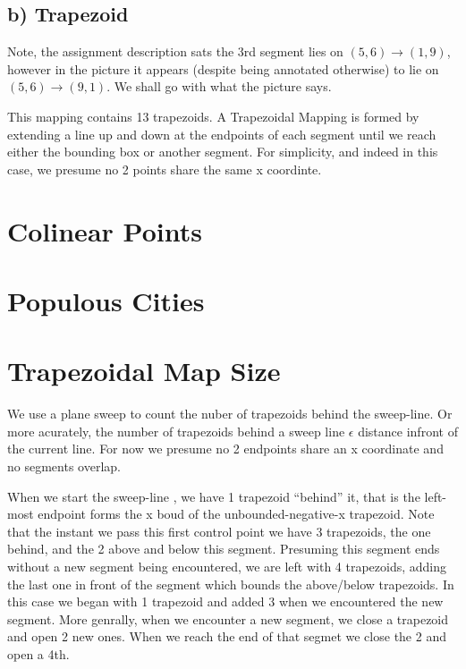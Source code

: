 \documentclass{article}
\begin{document}
\subsection{b) Trapezoid}
Note, the assignment description sats the 3rd segment lies on $(5,6) \rightarrow (1,9)$, however in the picture it appears (despite being annotated otherwise) to lie on $(5,6) \rightarrow (9,1)$.
We shall go with what the picture says.

This mapping contains 13 trapezoids.
A Trapezoidal Mapping is formed by extending a line up and down at the endpoints of each segment until we reach either the bounding box or another segment.
For simplicity, and indeed in this case, we presume no 2 points share the same x coordinte.

\section {Colinear Points}

\section {Populous Cities}

\section {Trapezoidal Map Size}

We use a plane sweep to count the nuber of trapezoids behind the sweep-line.
Or more acurately, the number of trapezoids behind a sweep line $\epsilon$ distance infront of the current line.
For now we presume no 2 endpoints share an x coordinate and no segments overlap.

When we start the sweep-line , we have 1 trapezoid ``behind'' it, that is the left-most endpoint forms the x boud of the unbounded-negative-x trapezoid.
Note that the instant we pass this first control point we have 3 trapezoids, the one behind, and the 2 above and below this segment.
Presuming this segment ends without a new segment being encountered, we are left with 4 trapezoids, adding the last one in front of the segment which bounds the above/below trapezoids.
In this case we began with 1 trapezoid and added 3 when we encountered the new segment.
More genrally, when we encounter a new segment, we close a trapezoid and open 2 new ones.
When we reach the end of that segmet we close the 2 and open a 4th.
\end{document}
